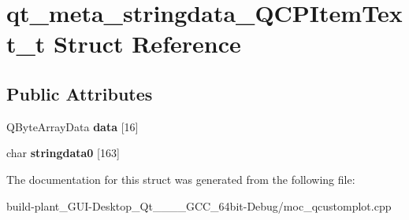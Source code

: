 \hypertarget{structqt__meta__stringdata__QCPItemText__t}{}\section{qt\+\_\+meta\+\_\+stringdata\+\_\+\+Q\+C\+P\+Item\+Text\+\_\+t Struct Reference}
\label{structqt__meta__stringdata__QCPItemText__t}
\subsection*{Public Attributes}
\begin{DoxyCompactItemize}
\item 
\mbox{\label{structqt__meta__stringdata__QCPItemText__t_a130c44d0975b8c3615445811c48edcab}} 
Q\+Byte\+Array\+Data {\bfseries data} \mbox{[}16\mbox{]}
\item 
\mbox{\label{structqt__meta__stringdata__QCPItemText__t_ab2e92c59ac0dced63f1fc1f4cc75cbc7}} 
char {\bfseries stringdata0} \mbox{[}163\mbox{]}
\end{DoxyCompactItemize}


The documentation for this struct was generated from the following file\+:\begin{DoxyCompactItemize}
\item 
build-\/plant\+\_\+\+G\+U\+I-\/\+Desktop\+\_\+\+Qt\+\_\+\_\+\_\+\_\+\+G\+C\+C\+\_\+64bit-\/\+Debug/moc\+\_\+qcustomplot.\+cpp\end{DoxyCompactItemize}

